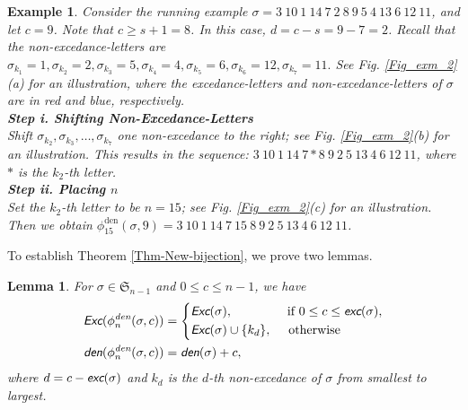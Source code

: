 \documentclass[12pt]{article}
\newtheorem{lemma}{Lemma}[section]
\newtheorem{example}{Example}[section]
\begin{document}
\begin{example}\label{example-Case3}
\emph{
Consider the running example
$\sigma=3~10~1~14~7~2~8~9~5~4~13~6~12~11$, and let $c=9$.
Note that $c\geq s+1=8$. 
In this case, $d=c-s=9-7=2$.
Recall that the non-excedance-letters are
$\sigma_{k_{1}}=1,\sigma_{k_{2}}=2,\sigma_{k_{3}}=5,\sigma_{k_{4}}=4,\sigma_{k_{5}}=6,\sigma_{k_{6}}=12,\sigma_{k_{7}}=11.$
See Fig. \ref{Fig_exm_2}(a) for an illustration,
where the excedance-letters and non-excedance-letters of $\sigma$ are in red and blue, respectively.
\\
\textbf{Step i. Shifting Non-Excedance-Letters}\\ 
Shift  $\sigma_{k_{2}},\sigma_{k_{3}},\ldots,\sigma_{k_{7}}$
one non-excedance to the right; 
see Fig. \ref{Fig_exm_2}(b) for an illustration.
This results in the sequence: $3~10~1~14~7*8~9~2~5~13~4~6~12~11$, 
where $\ast$ is the $k_{2}$-th letter.  
\\
\textbf{Step ii. Placing $n$}\\
Set the $k_{2}$-th letter to be $n=15$;  
see Fig. \ref{Fig_exm_2}(c) for an illustration.
Then we obtain $\phi_{15}^{\text{den}}(\sigma,9)=3~10~1~14~7~15~8~9~2~5~13~4~6~12~11$.
}\end{example}
\vspace{-6pt}
To establish Theorem \ref{Thm-New-bijection}, 
we prove two lemmas.
\begin{lemma}\label{lemma:Exc-den}
For $\sigma\in\mathfrak{S}_{n-1}$ and $0\leq c\leq n-1$, 
we have 
\begin{align*}
	\emph{\textsf{Exc}}(\phi_{n}^{\emph{\text{den}}}(\sigma,c))&=
	\left\{
	\begin{aligned}
		&\emph{\textsf{Exc}}(\sigma), \quad\quad\quad\quad~\text{if~}0\leq c\leq \emph{\textsf{exc}}(\sigma),\\
		&\emph{\textsf{Exc}}(\sigma)\cup\{k_{d}\},\quad\text{~otherwise}
	\end{aligned}
	\right. \\
	\emph{\textsf{den}}(\phi_{n}^{\emph{\text{den}}}(\sigma,c))&=\emph{\textsf{den}}(\sigma)+c, 
\end{align*}
where $d=c-\emph{\textsf{exc}}(\sigma)$ and
$k_{d}$ is the $d$-th non-excedance of $\sigma$ from smallest to largest.
\end{lemma} 
\end{document}
